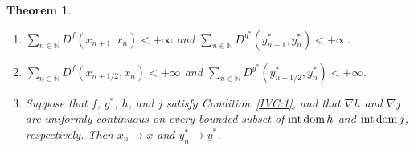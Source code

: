 \documentclass[a4paper,11pt,fleqn]{article}
\newcommand{\XXX}{\ensuremath{\boldsymbol{\mathcal X}}}
\newcommand{\NN}{\ensuremath{\mathbb N}}
\newcommand{\pinf}{\ensuremath{{+\infty}}}
\newcommand{\intdom}{\ensuremath{\text{\rm int\,dom}\,}}
\newtheorem{theorem}{Theorem}[section]
\theoremstyle{plain}{\theorembodyfont{\rmfamily}%
\newtheorem{conjecture}[theorem]{Conjecture}}
\theoremstyle{plain}{\theorembodyfont{\rmfamily}%
\newtheorem{example}[theorem]{Example}}
\theoremstyle{plain}{\theorembodyfont{\rmfamily}%
\newtheorem{remark}[theorem]{Remark}}
\theoremstyle{plain}{\theorembodyfont{\rmfamily}%
\newtheorem{algorithm}[theorem]{Algorithm}}
\theoremstyle{plain}{\theorembodyfont{\rmfamily}%
\newtheorem{condition}[theorem]{Condition}}
\theoremstyle{plain}{\theorembodyfont{\rmfamily}%
\newtheorem{definition}[theorem]{Definition}}
\theoremstyle{plain}{\theorembodyfont{\rmfamily}
\newtheorem{problem}[theorem]{Problem}}
\theoremstyle{plain}{\theorembodyfont{\rmfamily}
\newtheorem{notation}[theorem]{Notation}}
\numberwithin{equation}{section}
\begin{document}
\begin{theorem}
\begin{enumerate}
\begin{enumerate}
\item
\label{IVt:1id} 
$x_n=a_n$ and $y_n^*=b_n^*$.
\item
\label{IVt:1ie} 
$La_n=b_n$ and $a_n^*=-L^*b_n^*$.
\item
\label{IVt:1if} 
$\boldsymbol{H}_n=\XXX$.
\item
\label{IVt:1ig} 
$(x_{n+1/2},y_{n+1/2}^*)=(x_n,y_n^*)$.
\item
\label{IVt:1ih} 
$(x_{n+1},y_{n+1}^*)=(x_n,y_n^*)$.
\end{enumerate}
\item
\label{IVt:1ii} 
$\sum_{n\in\NN}D^f(x_{n+1},x_n)<\pinf$ and 
$\sum_{n\in\NN}D^{g^*}(y_{n+1}^*,y_n^*)<\pinf$.
\item
\label{IVt:1iii} 
$\sum_{n\in\NN}D^f(x_{n+1/2},x_n)<\pinf$ and 
$\sum_{n\in\NN}D^{g^*}(y_{n+1/2}^*,y_n^*)<\pinf$.
\item
\label{IVt:1iv}
Suppose that $f$, $g^*$, $h$, and $j$ satisfy Condition~\ref{IVC:1},
and that $\nabla h$ and $\nabla j$ are uniformly continuous on 
every bounded subset of $\intdom h$ and $\intdom j$, respectively.
Then $x_n\to\overline{x}$ and $y_n^*\to\overline{y}^*$.
\end{enumerate}
\end{theorem}
\end{document}
